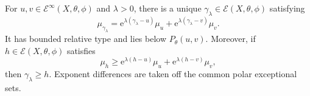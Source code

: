 \begin{theorem}\label{thm:relative-two-obstacle-exponential-equation}
For $u,v\in\mathcal E^\infty(X,\theta,\phi)$ and $\lambda>0$, there is a unique $\gamma_\lambda\in\mathcal E(X,\theta,\phi)$ satisfying
\begin{equation}\label{eq:relative-two-obstacle-exponential-equation}
 \mu_{\gamma_\lambda}
   =\mathrm e^{\lambda(\gamma_\lambda-u)}\mu_u
       +\mathrm e^{\lambda(\gamma_\lambda-v)}\mu_v.
\end{equation}
It has bounded relative type and lies below $P_\theta(u,v)$. Moreover, if $h\in\mathcal E(X,\theta,\phi)$ satisfies
\[
 \mu_h\geq\mathrm e^{\lambda(h-u)}\mu_u
                    +\mathrm e^{\lambda(h-v)}\mu_v,
\]
then $\gamma_\lambda\geq h$. Exponent differences are taken off the common polar exceptional sets.
\end{theorem}
